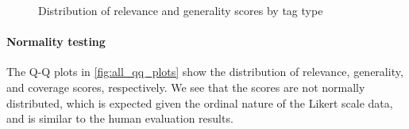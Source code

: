 \begin{figure}[h]
    \centering
    \hfill
    \caption{Distribution of relevance and generality scores by tag type}
    \label{fig:gpt_tag_type_score_distributions}
\end{figure}




\paragraph{Normality testing}
The Q-Q plots in \cref{fig:all_qq_plots} show the distribution of relevance, generality, and coverage scores, respectively. We see that the scores are not normally distributed, which is expected given the ordinal nature of the Likert scale data, and is similar to the human evaluation results.

